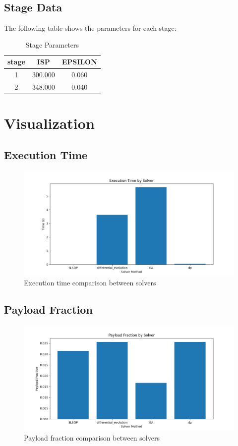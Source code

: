 \documentclass{article}
\begin{document}
\subsection{Stage Data}
The following table shows the parameters for each stage:
\begin{table}[H]
\centering
\caption{Stage Parameters}
\begin{tabular}{ccc}
\toprule
\midrule
stage & ISP & EPSILON \\
\midrule
1 & 300.000 & 0.060 \\
2 & 348.000 & 0.040 \\
\midrule
\bottomrule
\end{tabular}

\end{table}
\section{Visualization}
\subsection{Execution Time}
\begin{figure}[H]
\centering
\includegraphics[width=\textwidth]{execution_time.png}
\caption{Execution time comparison between solvers}
\end{figure}
\subsection{Payload Fraction}
\begin{figure}[H]
\centering
\includegraphics[width=\textwidth]{payload_fraction.png}
\caption{Payload fraction comparison between solvers}
\end{figure}
\end{document}
